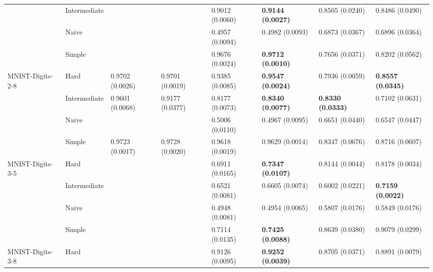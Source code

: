 \begin{tabular}{llllllll}
                 & Intermediate &                  &                           &           0.9012 (0.0060) &  \textbf{0.9144 (0.0027)} &           0.8505 (0.0240) &           0.8486 (0.0490) \\
                 & Naive &                  &                           &           0.4957 (0.0094) &           0.4982 (0.0093) &           0.6873 (0.0367) &           0.6896 (0.0364) \\
                 & Simple &                  &                           &           0.9676 (0.0024) &  \textbf{0.9712 (0.0010)} &           0.7656 (0.0371) &           0.8202 (0.0562) \\
MNIST-Digits-2-8 & Hard &  0.9702 (0.0026) &           0.9701 (0.0019) &           0.9385 (0.0085) &  \textbf{0.9547 (0.0024)} &           0.7936 (0.0059) &  \textbf{0.8557 (0.0345)} \\
                 & Intermediate &  0.9601 (0.0068) &           0.9177 (0.0377) &           0.8177 (0.0073) &  \textbf{0.8340 (0.0077)} &  \textbf{0.8330 (0.0333)} &           0.7102 (0.0631) \\
                 & Naive &                  &                           &           0.5006 (0.0110) &           0.4967 (0.0095) &           0.6651 (0.0440) &           0.6547 (0.0447) \\
                 & Simple &  0.9723 (0.0017) &           0.9728 (0.0020) &           0.9618 (0.0019) &           0.9629 (0.0014) &           0.8347 (0.0676) &           0.8716 (0.0607) \\
MNIST-Digits-3-5 & Hard &                  &                           &           0.6911 (0.0165) &  \textbf{0.7347 (0.0107)} &           0.8144 (0.0044) &           0.8178 (0.0034) \\
                 & Intermediate &                  &                           &           0.6521 (0.0081) &           0.6605 (0.0074) &           0.6002 (0.0221) &  \textbf{0.7159 (0.0022)} \\
                 & Naive &                  &                           &           0.4948 (0.0081) &           0.4954 (0.0065) &           0.5807 (0.0176) &           0.5849 (0.0176) \\
                 & Simple &                  &                           &           0.7114 (0.0135) &  \textbf{0.7425 (0.0088)} &           0.8639 (0.0380) &           0.9079 (0.0299) \\
MNIST-Digits-3-8 & Hard &                  &                           &           0.9126 (0.0095) &  \textbf{0.9252 (0.0039)} &           0.8705 (0.0371) &           0.8891 (0.0079) \\

\end{tabular}
